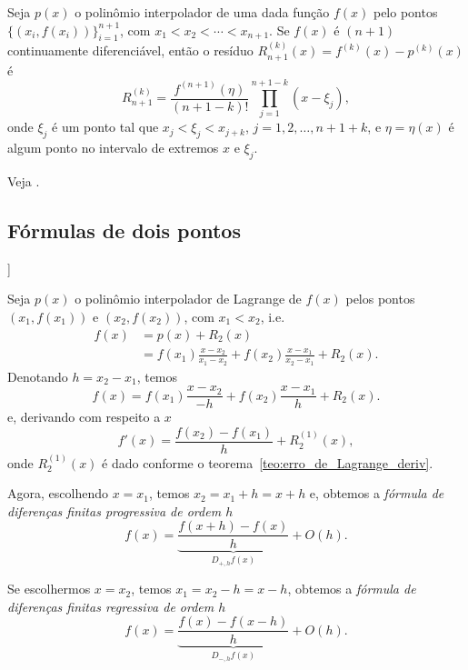 \begin{teo}\label{teo:erro_de_Lagrange_deriv}
  Seja $p(x)$ o polinômio interpolador de uma dada função $f(x)$ pelo pontos $\{(x_i, f(x_i))\}_{i=1}^{n+1}$, com $x_1<x_2<\cdots<x_{n+1}$. Se $f(x)$ é $(n+1)$ continuamente diferenciável, então o resíduo $R_{n+1}^{(k)}(x) = f^{(k)}(x) - p^{(k)}(x)$ é
  \begin{equation}
    R_{n+1}^{(k)} = \frac{f^{(n+1)}(\eta) }{(n+1-k)!}\prod_{j=1}^{n+1-k}(x-\xi_j),
  \end{equation}
onde $\xi_j$ é um ponto tal que $x_j < \xi_j < x_{j+k}$, $j=1, 2, \dotsc, n+1+k$, e $\eta = \eta(x)$ é algum ponto no intervalo de extremos $x$ e $\xi_j$. 
\end{teo}
\begin{dem}
  Veja \cite[Ch.6, Sec.5]{Isaacson1994a}.
\end{dem}

\subsection{Fórmulas de dois pontos}

\begin{flushleft}
  [[tag:revisar]]
\end{flushleft}

Seja $p(x)$ o polinômio interpolador de Lagrange de $f(x)$ pelos pontos $(x_1, f(x_1))$ e $(x_2, f(x_2))$, com $x_1 < x_2$, i.e.
\begin{align}
  f(x) &= p(x) + R_{2}(x)\\
  &= f(x_1)\frac{x-x_2}{x_1-x_2} + f(x_2)\frac{x-x_1}{x_2-x_1} + R_2(x).
\end{align}
Denotando $h=x_2-x_1$, temos
\begin{equation}
  f(x) = f(x_1)\frac{x-x_2}{-h} + f(x_2)\frac{x-x_1}{h} + R_2(x).
\end{equation}
e, derivando com respeito a $x$
\begin{equation}
  f'(x) = \frac{f(x_2)-f(x_1)}{h} + R_2^{(1)}(x),
\end{equation}
onde $ R_2^{(1)}(x)$ é dado conforme o teorema~\ref{teo:erro_de_Lagrange_deriv}.

Agora, escolhendo $x=x_1$, temos $x_2 = x_1 + h = x + h$ e, obtemos a \emph{fórmula de diferenças finitas progressiva de ordem $h$}
\begin{equation}
  f(x) = \underbrace{\frac{f(x+h) - f(x)}{h}}_{D_{+,h}f(x)} + O(h).
\end{equation}

Se escolhermos $x=x_2$, temos $x_1 = x_2 - h = x - h$, obtemos a \emph{fórmula de diferenças finitas regressiva de ordem $h$}
\begin{equation}
  f(x) = \underbrace{\frac{f(x) - f(x-h)}{h}}_{D_{-,h}f(x)} + O(h).
\end{equation}

